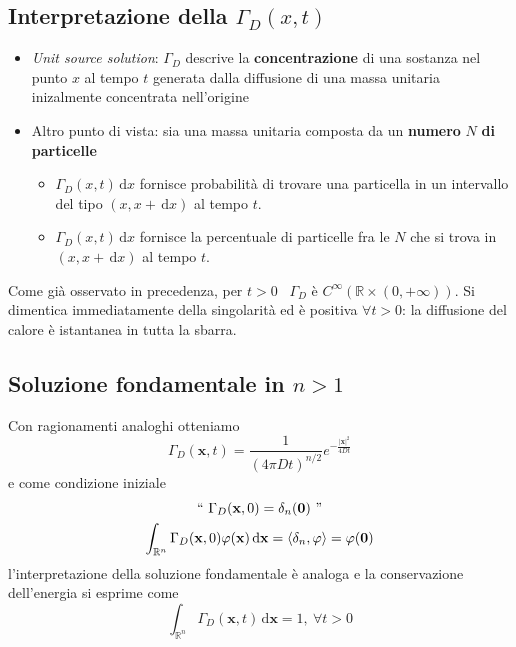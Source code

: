 \documentclass[10pt,a4paper,twoside,openright]{book}
\newcommand{\x}{\mathbf{x}}
\newcommand{\zer}{\mathbf{0}}
\newcommand{\de}{\,\mathrm d}
\newcommand{\dx}{\de x}
\newcommand{\dxx}{\de \x}
\begin{document}
\subsection{Interpretazione della \texorpdfstring{$\displaystyle \Gamma _{D}(x,t)$}{soluzione}}
\begin{itemize}
\item \textit{Unit source solution}: $\displaystyle \Gamma _{D}$ descrive la \textbf{concentrazione} di una sostanza nel punto $x$ al tempo $t$ generata dalla diffusione di una massa unitaria inizalmente concentrata nell'origine
\item Altro punto di vista: sia una massa unitaria composta da un \textbf{numero }$N$\textbf{ di particelle}
\begin{itemize}
\item $\displaystyle \Gamma _{D}(x,t) \dx$ fornisce probabilità di trovare una particella in un intervallo del tipo $\displaystyle (x,x+\dx)$ al tempo $t$.
\item $\displaystyle \Gamma _{D}(x,t) \dx$ fornisce la percentuale di particelle fra le $N$ che si trova in $\displaystyle (x,x+\dx)$ al tempo $t$.
\end{itemize}
\end{itemize}
\begin{nb}
Come già osservato in precedenza, per $t >0$ \ $\displaystyle \Gamma _{D}$ è $\displaystyle C^{\infty }(\mathbb{R} \times (0,+\infty))$. Si dimentica immediatamente della singolarità ed è positiva $\displaystyle \forall t >0$: la diffusione del calore è istantanea in tutta la sbarra.
\end{nb}
\subsection{Soluzione fondamentale in \texorpdfstring{$n>1$}{n>1}}

Con ragionamenti analoghi otteniamo
\begin{equation*}
\Gamma _{D}(\x,t) =\frac{1}{(4\pi Dt)^{n/2}} e^{-\frac{| \x| ^{2}}{4Dt}}
\end{equation*}
e come condizione iniziale
\begin{gather*}
``\ \Gamma _{D}(\x,0) =\delta _{n}(\zer) \ "\\
\int _{\mathbb{R}^{n}} \Gamma _{D}(\x,0) \varphi (\x) \dxx =\langle \delta _{n},\varphi \rangle =\varphi (\zer)
\end{gather*}
l'interpretazione della soluzione fondamentale è analoga e la conservazione dell'energia si esprime come
\begin{equation*}
\int _{\mathbb{R}^{n}} \Gamma _{D}(\x,t) \dxx =1,\ \forall t >0
\end{equation*}
\end{document}
